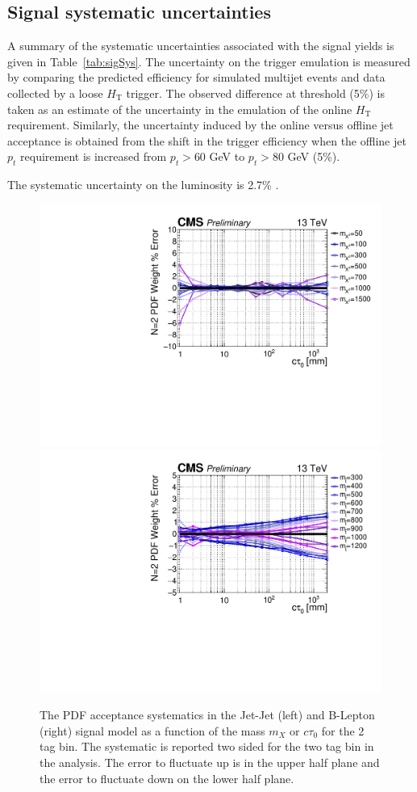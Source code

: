 \subsection{Signal systematic uncertainties}
\label{sec:sigsys}
A summary of the systematic uncertainties associated with the signal
yields is given in Table~\ref{tab:sigSys}.  The uncertainty on the
trigger emulation is measured by comparing the predicted efficiency
for simulated multijet events and data collected by a loose
$H_{\textrm{T}}$ trigger. The observed difference at threshold (5\%)
is taken as an estimate of the uncertainty in the emulation of the
online $H_{\textrm{T}}$ requirement.  Similarly, the uncertainty
induced by the online versus offline jet acceptance is obtained from
the shift in the trigger efficiency when the offline jet $p_{t}$
requirement is increased from $p_{t}>60$ GeV to $p_{t}>80$ GeV (5\%).

The systematic uncertainty on the luminosity is 2.7\% \cite{LUMI}.


\begin{figure}
\begin{center}
\includegraphics[width=.70\textwidth]{figures/an/SYSTEMATICS/76x_pu/sys_2tag_pdf.pdf}
\includegraphics[width=.70\textwidth]{figures/an/SYSTEMATICS/76x_pu/sys_2tag_pdf_dsusy.pdf}
\caption{The PDF acceptance  systematics in the Jet-Jet (left)
 and B-Lepton (right) signal model as a function of the mass $m_X$ 
or $c\tau_0$ for the 2 tag bin. The systematic is reported two sided 
for the two tag bin in the analysis. The error to fluctuate up is in
 the upper half plane and the error to fluctuate down on the lower half plane.  \label{fig:pdf_sys}}
\end{center}
\end{figure}

